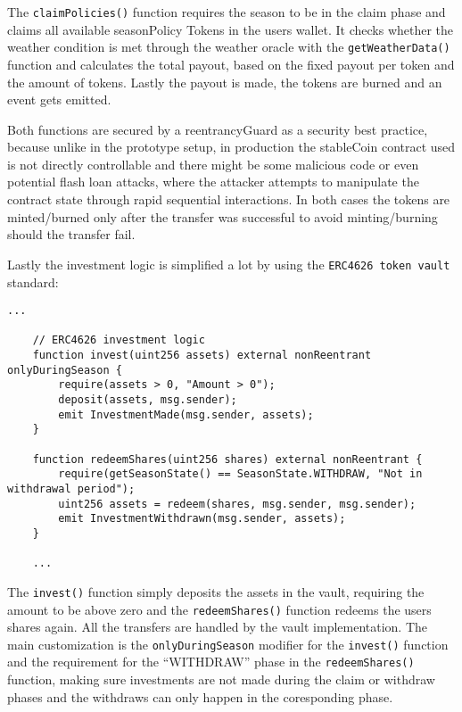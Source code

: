 \documentclass[11pt,a4paper]{article}
\begin{document}
    The \texttt{claimPolicies()} function requires the season to be in the claim phase and claims all available seasonPolicy Tokens in the users wallet.
    It checks whether the weather condition is met through the weather oracle with the \texttt{getWeatherData()} function and calculates the total payout, based on the fixed payout per token and the amount of tokens.
    Lastly the payout is made, the tokens are burned and an event gets emitted.

    Both functions are secured by a reentrancyGuard as a security best practice, because unlike in the prototype setup, in production the stableCoin contract used is not directly controllable and there might be some malicious code or even potential flash loan attacks, where the attacker attempts to manipulate the contract state through rapid sequential interactions.
    In both cases the tokens are minted/burned only after the transfer was successful to avoid minting/burning should the transfer fail.

    Lastly the investment logic is simplified a lot by using the \texttt{ERC4626 token vault} standard:

    \begin{lstlisting}[style=soliditystyle, caption={RainyDayFund.sol - Main Insurance Contract},label={lst:lstlisting4}]
    ...

    // ERC4626 investment logic
    function invest(uint256 assets) external nonReentrant onlyDuringSeason {
        require(assets > 0, "Amount > 0");
        deposit(assets, msg.sender);
        emit InvestmentMade(msg.sender, assets);
    }

    function redeemShares(uint256 shares) external nonReentrant {
        require(getSeasonState() == SeasonState.WITHDRAW, "Not in withdrawal period");
        uint256 assets = redeem(shares, msg.sender, msg.sender);
        emit InvestmentWithdrawn(msg.sender, assets);
    }

    ...
    \end{lstlisting}

    The \texttt{invest()} function simply deposits the assets in the vault, requiring the amount to be above zero and the \texttt{redeemShares()} function redeems the users shares again.
    All the transfers are handled by the vault implementation.
    The main customization is the \texttt{onlyDuringSeason} modifier for the \texttt{invest()} function and the requirement for the \enquote{WITHDRAW} phase in the \texttt{redeemShares()} function, making sure investments are not made during the claim or withdraw phases and the withdraws can only happen in the coresponding phase.
\end{document}
